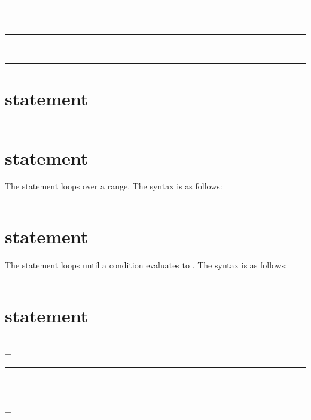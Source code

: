 \begin{grammar}
\rule{if-statement}  \code{(}  \code{)} \\
\rule{if-statement}  \code{(}  \code{)}   \\
\rule{if-statement}  \code{(}  \code{)}   
\end{grammar}

\section{ statement}

\begin{grammar}
\rule{return-statement}  \optional{} \code{;}
\end{grammar}

\section{ statement}

The  statement loops over a range. The syntax is as follows:

\begin{grammar}
\rule{for-statement}  \code{(}     \code{)} 
\end{grammar}

\section{ statement}

The  statement loops until a condition evaluates to .
The syntax is as follows:

\begin{grammar}
\rule{while-statement}  \code{(}  \code{)} 
\end{grammar}

\section{ statement}

\begin{grammar}
\rule{switch-statement}  \code{(}  \code{)} \code{\{} + \code{\}}\\
\rule{case}   \code{:} +\\
\rule{case}  \code{:} +
\end{grammar}

